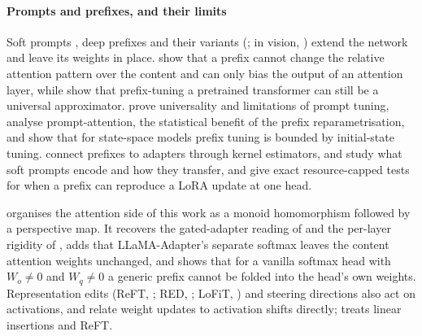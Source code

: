 \paragraph{Prompts and prefixes, and their limits}
Soft prompts \citep{lester2021power,liu2021gpt}, deep prefixes \citep{li2021prefix,liu2021p} and their variants (\citealp{vu2021spot,asai2022attempt,wang2023multitask,shi2023dept,razdaibiedina2023residual}; in vision, \citealp{jia2022visual,zhou2021learning,khattak2022maple}) extend the network and leave its weights in place. \citet{petrov2023prompting} show that a prefix cannot change the relative attention pattern over the content and can only bias the output of an attention layer, while \citet{petrov2024prompting} show that prefix-tuning a pretrained transformer can still be a universal approximator. \citet{wang2023universality} prove universality and limitations of prompt tuning, \citet{oymak2023role} analyse prompt-attention, \citet{le2024revisiting} the statistical benefit of the prefix reparametrisation, and \citet{galim2024parameter} show that for state-space models prefix tuning is bounded by initial-state tuning. \citet{chen2022inducer} connect prefixes to adapters through kernel estimators, \citet{khashabi2021prompt} and \citet{su2021transferability} study what soft prompts encode and how they transfer, and \citet{mondal2026can} give exact resource-capped tests for when a prefix can reproduce a LoRA update at one head.

 organises the attention side of this work as a monoid homomorphism followed by a perspective map. It recovers the gated-adapter reading of \citet{he2021unified} and the per-layer rigidity of \citet{petrov2023prompting}, adds that LLaMA-Adapter's \citep{zhang2023llama} separate softmax leaves the content attention weights unchanged, and shows that for a vanilla softmax head with $W_o\ne0$ and $W_q\ne0$ a generic prefix cannot be folded into the head's own weights. Representation edits (ReFT, \citealp{wu2024reft}; RED, \citealp{wu2024advancing}; LoFiT, \citealp{yin2024lofit}) and steering directions \citep{li2023inference,zou2023representation} also act on activations, and \citet{adila2026weight} relate weight updates to activation shifts directly;  treats linear insertions and ReFT.

